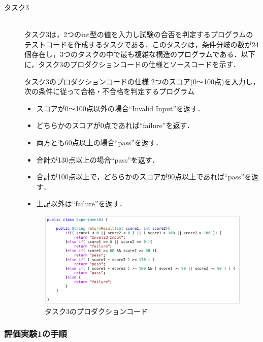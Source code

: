 \documentclass[12pt]{jarticle} %
\begin{document}
\begin{description}
\item[タスク3]~\\
タスク3は，2つのint型の値を入力し試験の合否を判定するプログラムのテストコードを作成するタスクである．このタスクは，条件分岐の数が24個存在し，3つのタスクの中で最も複雑な構造のプログラムである．以下に，タスク3のプロダクションコードの仕様とソースコードを示す．

\begin{itembox}[l]{タスク3のプロダクションコードの仕様}
2つのスコア(0～100点)を入力し，次の条件に従って合格・不合格を判定するプログラム
\begin{itemize}
\item スコアが0～100点以外の場合``Invalid Input''を返す．
\item どちらかのスコアが0点であれば``failure''を返す．
\item 両方とも60点以上の場合``pass''を返す．
\item 合計が130点以上の場合``pass''を返す．
\item 合計が100点以上で，どちらかのスコアが90点以上であれば``pass''を返す．
\item 上記以外は``failure''を返す．
\end{itemize}
\end{itembox}


\begin{figure}[htbp]
  \begin{center}
    \includegraphics[clip,width=15cm]{E3.pdf}
    \caption{タスク3のプロダクションコード}
    \label{E3}
  \end{center}
\end{figure}

\end{description}

\subsubsection{評価実験1の手順}
\end{document}
